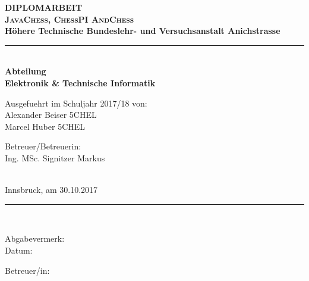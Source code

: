 \documentclass[12pt,a4paper]{article}
\begin{document}
\begin{titlepage}
 \begin{center}
   \begin{minipage}{\linewidth}
   \begin{center}
	\vspace*{-14mm}
	{\fontsize{25pt}{25pt}\selectfont\bf DIPLOMARBEIT}
	\\[19mm]{\fontsize{20pt}{20pt}\selectfont\color{blue}\textbf{\textsc{JavaChess, ChessPI AndChess}}}
	\\[15mm]{\fontsize{12.4pt}{12.4pt}\selectfont\bf
		Höhere Technische Bundeslehr- und Versuchsanstalt Anichstrasse}
	\\[ 5mm]\rule{132mm}{1.0pt}
	\\[ 4mm]{\fontsize{12.4pt}{12.4pt}\selectfont\bf Abteilung}
	\\[ 5mm]{\fontsize{12.4pt}{12.4pt}\selectfont\bf Elektronik \& Technische Informatik}
	\\[24mm]{\hspace*{2mm}\parbox{154mm}{\fontsize{12.4pt}{12.4pt}\selectfont
	  \parbox[t]{75mm}{
		Ausgefuehrt im Schuljahr 2017/18 von:
		\\[5.0mm]Alexander Beiser 5CHEL
		\\[2.5mm]Marcel Huber 5CHEL 
	  }
	  \hspace*{6mm}
	  \parbox[t]{50mm}{
		Betreuer/Betreuerin:
		\\[5.0mm]Ing. MSc. Signitzer Markus
	  }
	  \\[14mm]{Innsbruck, am 30.10.2017}
	  \\[16mm]\rule{150mm}{0.5pt}
	  \\[ 8mm]
	  \parbox[t]{75mm}{
		Abgabevermerk:
		\\[3.25mm]Datum:
	  }
	  \hspace*{6mm}
	  \parbox[t]{50mm}{
		Betreuer/in:
	  }
	}}
   \end{center}\hfill
   \end{minipage}
 \end{center}
\end{titlepage}


\addtocounter{page}{1}


\end{document}
